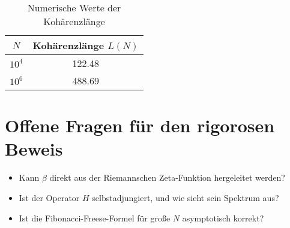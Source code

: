 \documentclass{article}
\begin{document}
\begin{table}[h]
    \centering
    \begin{tabular}{|c|c|}
    \hline
    $N$ & Kohärenzlänge $L(N)$ \\
    \hline
    $10^4$ & 122.48 \\
    $10^6$ & 488.69 \\
    \hline
    \end{tabular}
    \caption{Numerische Werte der Kohärenzlänge}
\end{table}

\section{Offene Fragen für den rigorosen Beweis}
\begin{itemize}
    \item Kann $ \beta $ direkt aus der Riemannschen Zeta-Funktion hergeleitet werden?
    \item Ist der Operator $ H $ selbstadjungiert, und wie sieht sein Spektrum aus?
    \item Ist die Fibonacci-Freese-Formel für große $ N $ asymptotisch korrekt?
\end{itemize}
\end{document}
